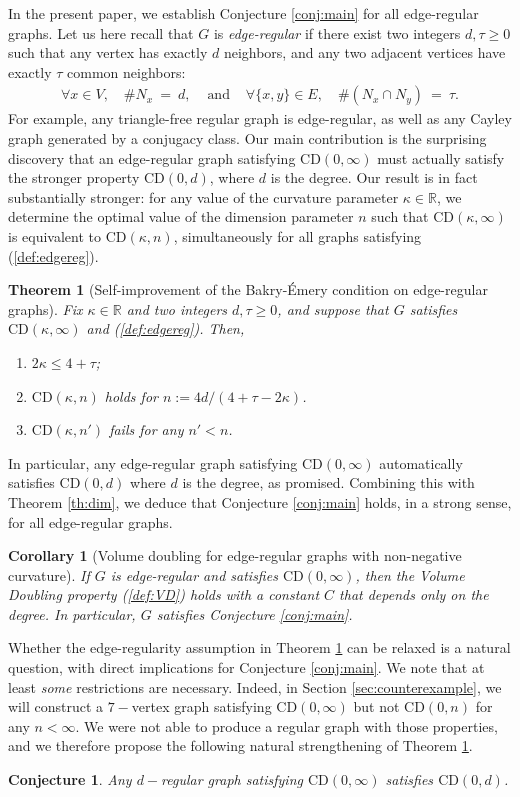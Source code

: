 \documentclass[10pt,a4paper]{amsart}
\newtheorem{theorem}{Theorem}
\newtheorem{corollary}{Corollary}
\newtheorem{conjecture}{Conjecture}
\newcommand{\dR}{\mathbb {R}}
\newcommand{\CD}{\mathrm{CD}}
\begin{document}
In the present paper, we establish Conjecture \ref{conj:main} for all edge-regular graphs. Let us here recall that $G$ is \emph{edge-regular} if there exist two integers $d,\tau\ge 0$ such that any vertex has exactly $d$ neighbors, and any two adjacent vertices have exactly $\tau$ common neighbors:
\begin{eqnarray}
\label{def:edgereg}
\forall x\in V,\quad \# N_x\ =\ d, & \textrm{ and } & \forall \{x,y\}\in E,\quad  \#(N_x\cap N_y)\ =\ \tau.
\end{eqnarray}
For example, any  triangle-free regular graph is edge-regular, as well as any Cayley graph generated by a conjugacy class. Our main contribution is the surprising discovery that an edge-regular graph satisfying $\CD(0,\infty)$ must actually  satisfy the stronger property $\CD(0,d)$, where $d$ is the degree. Our result is in fact substantially stronger: for any value of the curvature parameter $\kappa\in\dR$, we determine the optimal value of the dimension parameter $n$ such that $\CD(\kappa,\infty)$ is equivalent to $\CD(\kappa,n)$, simultaneously for all graphs satisfying (\ref{def:edgereg}).
\begin{theorem}[Self-improvement of the Bakry-\'Emery condition on edge-regular graphs]\label{th:main}Fix $\kappa\in\dR$ and two integers $d,\tau\ge 0$, and suppose that $G$ satisfies $\CD(\kappa,\infty)$ and (\ref{def:edgereg}). Then, 
\begin{enumerate}
\item  $2\kappa\le 4+\tau$; 
\item $\CD(\kappa,n)$ holds for $n:=4d/(4+\tau-2\kappa)$.
\item $\CD(\kappa,n')$ fails for any $n'<n$. 
\end{enumerate}
\end{theorem}
In particular, any edge-regular graph satisfying $\CD(0,\infty)$ automatically satisfies $\CD(0,d)$ where $d$ is the degree, as promised. Combining this with Theorem \ref{th:dim}, we deduce that Conjecture \ref{conj:main} holds, in a strong sense, for all edge-regular graphs. 
\begin{corollary}[Volume doubling for edge-regular graphs with non-negative curvature]If $G$ is edge-regular and satisfies $\CD(0,\infty)$, then the Volume Doubling property (\ref{def:VD}) holds with a constant $C$ that depends only on the degree. In particular,  $G$ satisfies Conjecture \ref{conj:main}. 
\end{corollary}
Whether the edge-regularity assumption in  Theorem \ref{th:main} can be relaxed is a natural question, with direct implications for Conjecture \ref{conj:main}. We note that at least \emph{some} restrictions are necessary. Indeed, in Section \ref{sec:counterexample}, we will construct a $7-$vertex graph satisfying $\CD(0,\infty)$ but not $\CD(0,n)$ for any $n<\infty$. 
We were not able to produce a regular graph with those properties, and we therefore propose the following natural strengthening of Theorem \ref{th:main}. 
\begin{conjecture}
Any $d-$regular graph satisfying $\CD(0,\infty)$ satisfies $\CD(0,d)$.
\end{conjecture}
\end{document}
